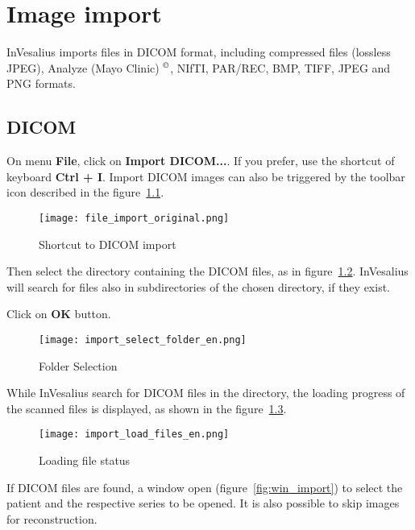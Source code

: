 \chapter{Image import}

InVesalius imports files in DICOM format, including compressed files (lossless JPEG), Analyze (Mayo Clinic) $^\copyright$, NIfTI, PAR/REC, BMP, TIFF, JPEG and PNG formats.

\section{DICOM}

On menu \textbf{File}, click on \textbf{Import DICOM...}. If you prefer, use the shortcut of keyboard \textbf{Ctrl + I}. Import DICOM images can also be triggered by the toolbar icon described in the figure~\ref{fig:import}.

\begin{figure}[!htb]
\centering
\texttt{[image: file\_import\_original.png]}
\caption{Shortcut to DICOM import}
\label{fig:import}
\end{figure}

\hspace{.2cm}

Then select the directory containing the DICOM files, as in figure~\ref{fig:win_folder}. InVesalius will search for files also in subdirectories of the chosen directory, if they exist.

\newpage

Click on \textbf{OK} button.

\begin{figure}[!htb]
\centering
\texttt{[image: import\_select\_folder\_en.png]}
\caption{Folder Selection}
\label{fig:win_folder}
\end{figure}

\hspace{.2cm}

While InVesalius search for DICOM files in the directory, the loading progress of the scanned files is displayed, as shown in the figure~\ref{fig:ver_file}.

\begin{figure}[!htb]
\centering
\texttt{[image: import\_load\_files\_en.png]}
\caption{Loading file status}
\label{fig:ver_file}
\end{figure}

\newpage

If DICOM files are found, a window open (figure~\ref{fig:win_import}) to select the patient and the respective series to be opened. It is also possible to skip images for reconstruction.

